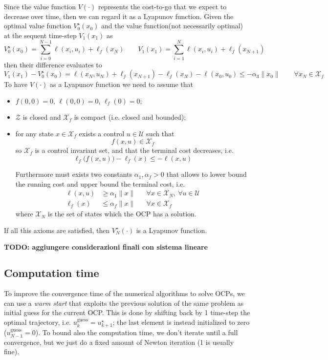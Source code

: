 	Since the value function $V(\cdot)$ represents the cost-to-go that we expect to decrease over time, then we can regard it as a Lyapunov function. Given the optimal value function $V_0^\star(x_0)$ and the value function(not necessarily optimal) at the sequent time-step $V_1(x_1)$ as
	\[ V_0^\star(x_0) = \sum_{i=0}^{N-1} \ell(x_i, u_i) + \ell_f (x_N) \qquad V_1(x_1) = \sum_{i=1}^N \ell(x_i, u_i) + \ell_f(x_{N+1})  \]
	then their difference evaluates to
	\[ V_1(x_1) - V_0^\star(x_0) = \ell(x_N,u_N) + \ell_f(x_{N+1}) - \ell_f(x_N) - \ell(x_0, u_0) \leq -\alpha_3 \|x_0\| \qquad \forall x_N \in \mathcal X_f \]
	To have $V(\cdot)$ as a Lyapunov function we need to assume that
	\begin{itemize}
		\item $f(0,0) = 0$, $\ell(0, 0) = 0$, $\ell_f(0) = 0$;
		\item $\mathcal Z$ is closed and $\mathcal X_f$ is compact (i.e. closed and bounded);
		\item for any state $x \in \mathcal X_f$ exists a control $u \in \mathcal U$ such that
		\[ f(x,u) \in \mathcal X_f \]
		so $\mathcal X_f$ is a control invariant set, and that the terminal cost decreases, i.e.
		\[ \ell_f\big(f(x,u)\big) - \ell_f(x) \leq -\ell(x,u) \]
		
		Furthermore must exists two constants $\alpha_1,\alpha_f > 0$ that allows to lower bound the running cost and upper bound the terminal cost, i.e. 
		\begin{align*}
			\ell(x,u) & \geq \alpha_1 \|x\| && \forall x \in \mathcal X_N, \ \forall u \in \mathcal U \\
			\ell_f(x) & \leq \alpha_f \|x\| && \forall x \in \mathcal X_f
		\end{align*}
		where $\mathcal X_N$ is the set of states which the OCP has a solution.
	\end{itemize}
	If all this axioms are satisfied, then $V_N^\star(\cdot)$ is a Lyapunov function.
	
	\textbf{TODO: aggiungere considerazioni finali con sistema lineare}
	

\subsection{Computation time}
	To improve the convergence time of the numerical algorithms to solve OCPs, we can use a \textit{warm start} that exploits the previous solution of the same problem as initial guess for the current OCP. This is done by shifting back by 1 time-step the optimal trajectory, i.e. $u_k^\textrm{guess} = u_{k+1}^\star$; the last element is instead initialized to zero ($u_{N-1}^\textrm{guess} = 0$). To bound also the computation time, we don't iterate until a full convergence, but we just do a fixed amount of Newton iteration (1 is usually fine).
	
	
	
	
	
	
	
	
	
	
	
